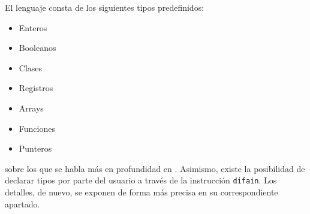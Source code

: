 \documentclass[10pt,a4paper]{article}
\begin{document}
El lenguaje consta de los siguientes tipos predefinidos:
\begin{itemize}
    \item Enteros
    \item Booleanos
    \item Clases
    \item Registros
    \item Arrays
    \item Funciones
    \item Punteros
\end{itemize}
sobre los que se habla más en profundidad en . Asimismo, existe la posibilidad de declarar tipos por parte del usuario a través de la instrucción \texttt{\color{blue}difain}. Los detalles, de nuevo, se exponen de forma más precisa en su correspondiente apartado.
\end{document}

